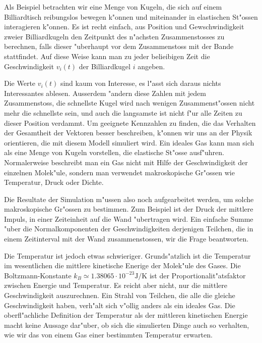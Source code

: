 \begin{beispiel}
Als Beispiel betrachten wir eine Menge von Kugeln, die sich auf einem
Billiardtisch reibungslos bewegen k"onnen und miteinander in elastischen
St"ossen interagieren k"onnen. Es ist recht einfach, aus Position und
Gewschwindigkeit zweier
Billiardkugeln den Zeitpunkt des n"achsten Zusammenstosses zu berechnen,
falls dieser "uberhaupt vor dem Zusammenstoss mit der Bande stattfindet.
Auf diese Weise kann man zu jeder belieibigen Zeit die Geschwindigkeit
$v_i(t)$ der Billiardkugel $i$ angeben.

Die Werte $v_i(t)$ sind kaum von Interesse, es l"asst sich daraus nichts
Interessantes ablesen.
Ausserdem "andern diese Zahlen mit jedem Zusammenstoss, die schnellste
Kugel wird nach wenigen Zusammenst"ossen nicht mehr die schnellste sein,
und auch die langsamste ist nicht f"ur alle Zeiten zu dieser Position
verdammt.
Um geeignete Kennzahlen zu finden, die das Verhalten der Gesamtheit
der Vektoren besser beschreiben, k"onnen wir uns an der Physik orientieren,
die mit diesem Modell simuliert wird.
Ein ideales Gas kann man sich als eine Menge von Kugeln vorstellen,
die elastische St"osse ausf"uhren.
Normalerweise beschreibt man ein Gas nicht mit Hilfe der Geschwindigkeit
der einzelnen Molek"ule, sondern man verwendet makroskopische Gr"ossen
wie Temperatur, Druck oder Dichte.

Die Resultate der Simulation m"ussen also noch aufgearbeitet werden, um
solche makroskopische Gr"ossen zu bestimmen.
Zum Beispiel ist der Druck der mittlere Impuls, in einer Zeiteinheit
auf die Wand "ubertragen wird.
Ein einfache Summe "uber die Normalkomponenten der Geschwindigkeiten
derjenigen Teilchen, die in einem Zeitinterval mit der Wand zusammenstossen,
wir die Frage beantworten.

Die Temperatur ist jedoch etwas schwieriger.
Grunds"atzlich ist die Temperatur im wesentlichen die mittlere 
kinetische Enerige der Molek"ule des Gases. Die Boltzmann-Konstante
$k_B\simeq 1.38065\cdot10^{-23} \text{J/K}$ ist der Proportionalit"atsfaktor
zwischen Energie und Temperatur.
Es reicht aber nicht,
nur die mittlere Geschwindigkeit auszurechnen.
Ein Strahl von Teilchen, die alle die gleiche Geschwindigkeit haben,
verh"alt sich v"ollig anders als ein ideales Gas.
Die oberfl"achliche Definition der Temperatur als der mittleren
kinetischen Energie macht keine Aussage dar"uber, ob sich die
simulierten Dinge auch so verhalten, wie wir das von einem
Gas einer bestimmten Temperatur erwarten.


\end{beispiel}
